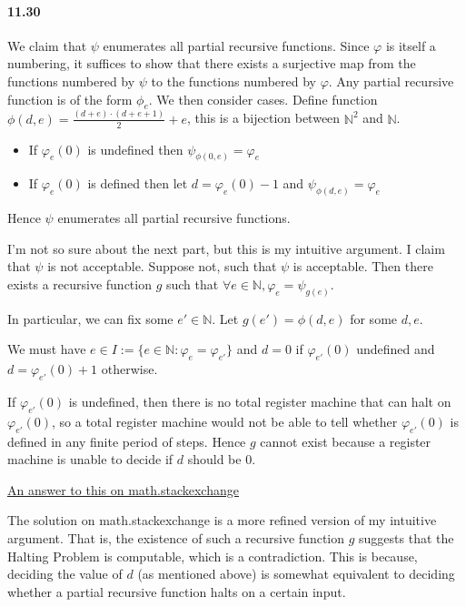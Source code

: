 \documentclass{article}
\begin{document}
\paragraph{11.30} 
We claim that $\psi$ enumerates all partial recursive functions. Since $\varphi$ is itself a numbering, it suffices to show that there exists a surjective map from the functions numbered by $\psi$ to the functions numbered by $\varphi$. Any partial recursive function is of the form $\phi_e$. We then consider cases. Define function $\phi(d,e) = \frac{(d+e)\cdot (d+e+1)}{2}+e$, this is a bijection between $\mathbb{N}^2$ and $\mathbb{N}$.

\begin{itemize}
	\item If $\varphi_e(0)$ is undefined then $\psi_{\phi(0,e)}=\varphi_e$
	\item If $\varphi_e(0)$ is defined then let $d=\varphi_e(0)-1$ and  $\psi_{\phi(d,e)} = \varphi_e$
\end{itemize}
Hence $\psi$ enumerates all partial recursive functions.

I'm not so sure about the next part, but this is my intuitive argument.
I claim that $\psi$ is not acceptable. Suppose not, such that $\psi$ is acceptable. Then there exists a recursive function $g$ such that $\forall e\in \mathbb{N}, \varphi_e=\psi_{g(e)}$.

In particular, we can fix some $e'\in \mathbb{N}$. Let $g(e')=\phi(d,e)$ for some $d,e$.

We must have $e\in I:=\{e\in \mathbb{N} : \varphi_e=\varphi_{e'}\}$ and $d=0$ if $\varphi_{e'}(0)$ undefined and $d=\varphi_{e'}(0)+1$ otherwise.

If $\varphi_{e'}(0)$ is undefined, then there is no total register machine that can halt on $\varphi_{e'}(0)$, so a total register machine would not be able to tell whether $\varphi_{e'}(0)$ is defined in any finite period of steps. Hence $g$ cannot exist because a register machine is unable to decide if $d$ should be $0$.

\href{https://math.stackexchange.com/questions/3372549/a-surjection-on-the-partially-computable-functions-that-is-not-acceptable}{An answer to this on math.stackexchange}

The solution on math.stackexchange is a more refined version of my intuitive argument. That is, the existence of such a recursive function $g$ suggests that the Halting Problem is computable, which is a contradiction. This is because, deciding the value of $d$ (as mentioned above) is somewhat equivalent to deciding whether a partial recursive function halts on a certain input.
\end{document}
